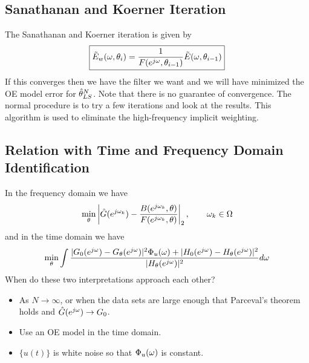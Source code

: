 \subsection{Sanathanan and Koerner Iteration}
The Sanathanan and Koerner iteration is given by
\begin{align*}
\boxed{\tilde{E}_w(\omega,\theta_i) = \frac{1}{F(e^{j\omega},\theta_{i-1})}\tilde{E}(\omega,\theta_{i-1})}
\end{align*}
If this converges then we have the filter we want and we will have minimized the OE model error for $\hat{\theta}_{LS}^N$. Note that there is no guarantee of convergence. The normal procedure is to try a few iterations and look at the results. This algorithm is used to eliminate the high-frequency implicit weighting.

\subsection{Relation with Time and Frequency Domain Identification}
In the frequency domain we have
\begin{align*}
\min_\theta\left|\hat{G}(e^{j\omega_k}) - \frac{B(e^{j\omega_k},\theta)}{F(e^{j\omega_k},\theta)}\right|_2, \qquad \omega_k\in\Omega
\end{align*}
and in the time domain we have
\begin{align*}
\min_\theta\int\frac{|G_0(e^{j\omega})-G_\theta(e^{j\omega})|^2\Phi_u(\omega) + |H_0(e^{j\omega})-H_\theta(e^{j\omega})|^2}{|H_\theta(e^{j\omega})|^2}d\omega
\end{align*}
When do these two interpretations approach each other?
\begin{itemize}
\item As $N\to\infty$, or when the data sets are large enough that Parceval's theorem holds and $\hat{G}(e^{j\omega})\to G_0$.
\item Use an OE model in the time domain.
\item $\{u(t)\}$ is white noise so that $\Phi_u(\omega)$ is constant.
\end{itemize}
